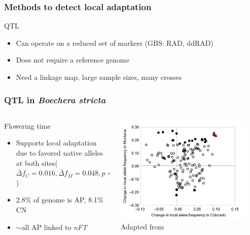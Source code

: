 \begin{frame}
\frametitle{Methods to detect local adaptation}
\begin{block}{QTL}
\begin{itemize}
\item{Can operate on a reduced set of markers (GBS: RAD, ddRAD)}
\item{Does not require a reference genome}
\item{Need a linkage map, large sample sizes, many crosses}
\end{itemize}
\end{block}
\end{frame}

\begin{frame}
\frametitle{QTL in \textit{Boechera stricta}}
\begin{columns}

\begin{column}{0.4\textwidth}
\footnotesize
\begin{block}{Flowering time}
\begin{itemize}
\item{Supports local adaptation due to favored native alleles at 
both sites($\bar{\Delta} f_C = 0.016, \bar{\Delta} f_M = 
0.048, p < 0.001$)}
\item{2.8\% of genome is AP, 8.1\% CN}
\item{$\sim$all AP linked to \textit{nFT}}
\end{itemize}
\end{block}


\end{column}

\begin{column}{0.6\textwidth}
\centering
\includegraphics[width=0.9\textwidth]{boechera.png}\\
\tiny
Adapted from \citet[Figure 1]{Anderson:2012cb}

\end{column}

	
\end{columns}

\end{frame}

